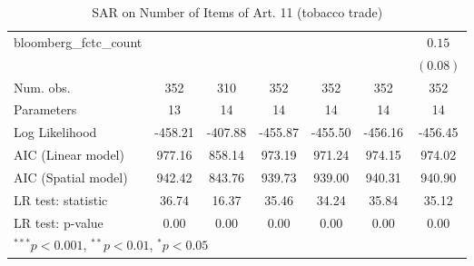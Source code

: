 \begin{table}[!h]
\begin{center}
\begin{tabular}{l c c c c c c }
bloomberg\_fctc\_count  &              &              &              &              &              & $0.15$       \\
                        &              &              &              &              &              & $(0.08)$     \\
\midrule
Num. obs.               & 352          & 310          & 352          & 352          & 352          & 352          \\
Parameters              & 13           & 14           & 14           & 14           & 14           & 14           \\
Log Likelihood          & -458.21      & -407.88      & -455.87      & -455.50      & -456.16      & -456.45      \\
AIC (Linear model)      & 977.16       & 858.14       & 973.19       & 971.24       & 974.15       & 974.02       \\
AIC (Spatial model)     & 942.42       & 843.76       & 939.73       & 939.00       & 940.31       & 940.90       \\
LR test: statistic      & 36.74        & 16.37        & 35.46        & 34.24        & 35.84        & 35.12        \\
LR test: p-value        & 0.00         & 0.00         & 0.00         & 0.00         & 0.00         & 0.00         \\
\bottomrule
\multicolumn{7}{l}{\scriptsize{$^{***}p<0.001$, $^{**}p<0.01$, $^*p<0.05$}}
\end{tabular}
\caption{SAR on Number of Items of Art. 11 (tobacco trade)}
\label{table:coefficients}
\end{center}
\end{table}
